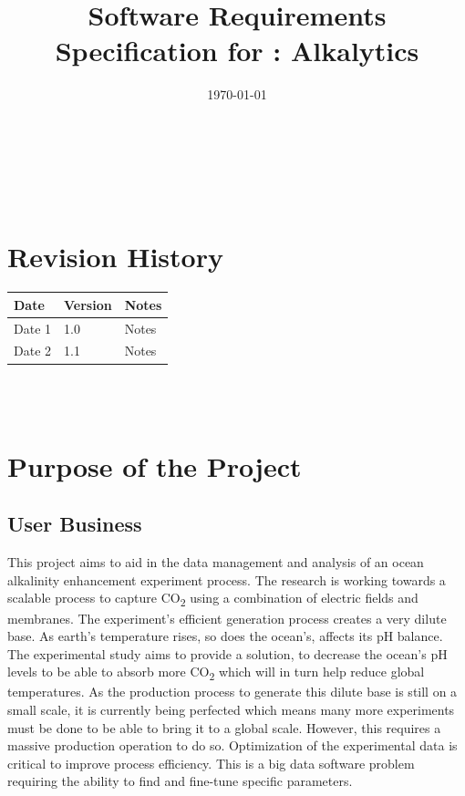 \documentclass[12pt]{article}
\begin{document}
\title{Software Requirements Specification for \progname: Alkalytics} 
\author{\authname}
\date{\today}
	
\maketitle

~\newpage


\tableofcontents

~\newpage

\section*{Revision History}

\begin{tabularx}{\textwidth}{p{3cm}p{2cm}X} \toprule {\textbf{Date}} &
{\textbf{Version}} & {\textbf{Notes}}\\
\midrule
Date 1 & 1.0 & Notes\\
Date 2 & 1.1 & Notes\\
\bottomrule
\end{tabularx}

~\\

~\newpage
\section{Purpose of the Project}
\subsection{User Business}
This project aims to aid in the data management and analysis of an ocean
alkalinity enhancement experiment process. The research is working towards a
scalable process to capture CO\textsubscript{2} using a combination of electric
fields and membranes. The experiment's efficient generation process creates a
very dilute base. As earth’s temperature rises, so does the ocean’s, affects its
pH balance. The experimental study aims to provide a solution, to decrease the
ocean's pH levels to be able to absorb more CO\textsubscript{2} which will in
turn help reduce global temperatures.  As the production process to generate
this dilute base is still on a small scale, it is currently being perfected
which means many more experiments must be done to be able to bring it to a
global scale. However, this requires a massive production operation to do so.
Optimization of the experimental data is critical to improve process efficiency.
This is a big data software problem requiring the ability to find and fine-tune
specific parameters. 
\end{document}
